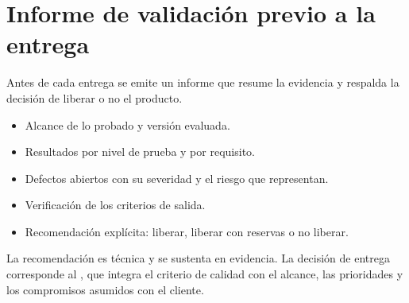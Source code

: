 \documentclass[11pt,a4paper]{article}
\begin{document}
\section{Informe de validación previo a la entrega}

Antes de cada entrega se emite un informe que resume la evidencia y respalda la
decisión de liberar o no el producto.

\begin{itemize}
  \item Alcance de lo probado y versión evaluada.
  \item Resultados por nivel de prueba y por requisito.
  \item Defectos abiertos con su severidad y el riesgo que representan.
  \item Verificación de los criterios de salida.
  \item Recomendación explícita: liberar, liberar con reservas o no liberar.
\end{itemize}

\begin{nota}
La recomendación es técnica y se sustenta en evidencia. La decisión de entrega
corresponde al \lgDirectorRol, que integra el criterio de calidad con el alcance,
las prioridades y los compromisos asumidos con el cliente.
\end{nota}
\end{document}
